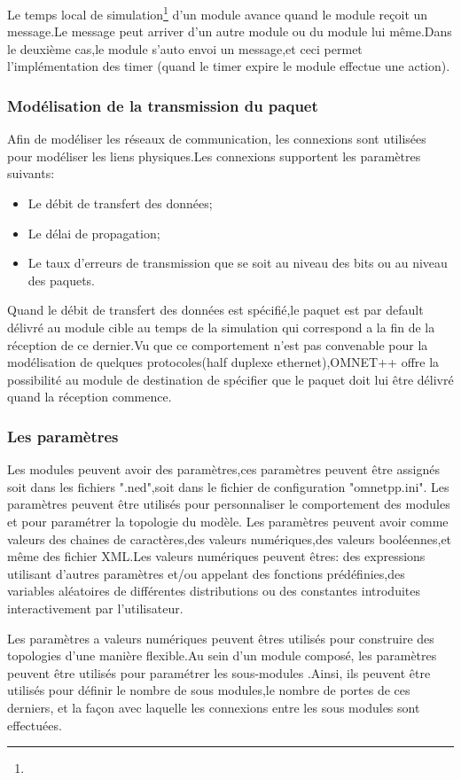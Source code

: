 Le temps local de simulation\footnote{} d'un module avance quand le module reçoit un message.Le message peut arriver d'un autre module ou du module lui même.Dans le deuxième cas,le module s'auto envoi un message,et ceci permet l'implémentation des timer (quand le timer expire le module effectue une action).
\subsubsection{Modélisation de la transmission du paquet}
Afin de modéliser les réseaux de communication,
les connexions sont utilisées pour modéliser les liens physiques.Les connexions supportent les paramètres suivants:
\begin{itemize}
\item Le débit de transfert des données;
\item Le délai de propagation;
\item Le taux d'erreurs de transmission que se soit au niveau des bits ou au niveau des paquets.
\end{itemize}

Quand le débit de transfert des données est spécifié,le paquet est par default délivré au module cible au temps de la simulation qui correspond a la fin de la réception de ce dernier.Vu que ce comportement n'est pas convenable pour la modélisation de quelques protocoles(half duplexe ethernet),OMNET++ offre la possibilité au module de destination de spécifier que le paquet doit lui être délivré quand la réception commence.
\subsubsection{Les paramètres}
Les modules peuvent avoir des paramètres,ces paramètres peuvent être assignés  soit dans les fichiers ".ned",soit dans le fichier de configuration  "omnetpp.ini".
Les paramètres peuvent être utilisés pour personnaliser le comportement des modules  et pour paramétrer la topologie du modèle.
Les paramètres peuvent avoir comme valeurs des chaines de caractères,des valeurs numériques,des valeurs booléennes,et même des fichier XML.Les valeurs numériques  peuvent êtres: des expressions utilisant d'autres paramètres et/ou appelant des fonctions prédéfinies,des variables aléatoires de différentes distributions  ou des constantes introduites interactivement par l'utilisateur.

Les paramètres a valeurs  numériques peuvent êtres utilisés pour construire des topologies d'une manière flexible.Au sein d'un module composé, les paramètres peuvent être utilisés pour paramétrer les sous-modules .Ainsi, ils peuvent être utilisés pour définir le nombre de sous modules,le nombre de portes de ces derniers, et la façon avec laquelle les connexions entre les sous modules sont effectuées.

